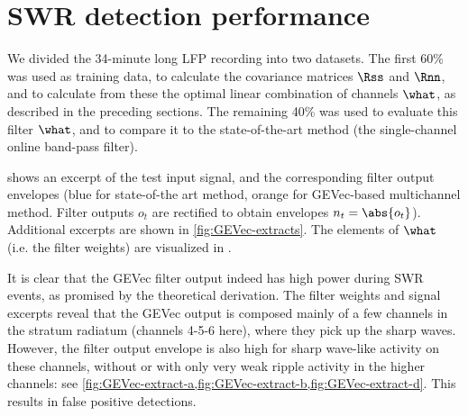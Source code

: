\section{SWR detection performance}

We divided the 34-minute long LFP recording into two datasets. The first 60\% was used as training data, to calculate the covariance matrices $\Rss$ and $\Rnn$, and to calculate from these the optimal linear combination of channels $\what$, as described in the preceding sections. The remaining 40\% was used to evaluate this filter $\what$, and to compare it to the state-of-the-art method (the single-channel online band-pass filter).\footnotemark{}


\begin{figure}
\label{fig:LSM-comp}
\end{figure}

 shows an excerpt of the test input signal, and the corresponding filter output envelopes (blue for state-of-the art method, orange for GEVec-based multichannel method. Filter outputs $o_t$ are rectified to obtain envelopes $n_t = \abs{o_t}$). Additional excerpts are shown in \cref{fig:GEVec-extracts}. The elements of $\what$ (i.e. the filter weights) are visualized in .

It is clear that the GEVec filter output indeed has high power during SWR events, as promised by the theoretical derivation. The filter weights and signal excerpts reveal that the GEVec output is composed mainly of a few channels in the stratum radiatum (channels 4-5-6 here), where they pick up the sharp waves. However, the filter output envelope is also high for sharp wave-like activity on these channels, without or with only very weak ripple activity in the higher channels: see \cref{fig:GEVec-extract-a,fig:GEVec-extract-b,fig:GEVec-extract-d}. This results in false positive detections.


